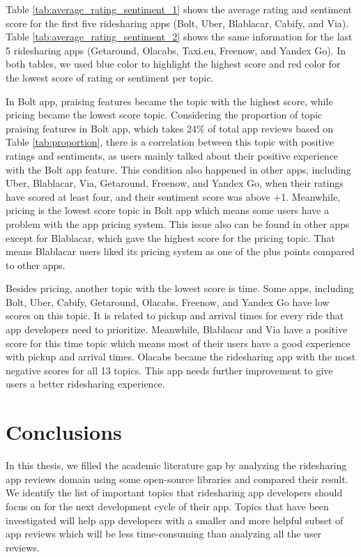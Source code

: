 \documentclass[12pt]{article}
\begin{document}
Table \ref{tab:average_rating_sentiment_1} shows the average rating and sentiment score for the first five ridesharing apps (Bolt, Uber, Blablacar, Cabify, and Via). Table \ref{tab:average_rating_sentiment_2} shows the same information for the last 5 ridesharing apps (Getaround, Olacabs, Taxi.eu, Freenow, and Yandex Go). In both tables, we used blue color to highlight the highest score and red color for the lowest score of rating or sentiment per topic.

In Bolt app, praising features became the topic with the highest score, while pricing became the lowest score topic. Considering the proportion of topic praising features in Bolt app, which takes 24\% of total app reviews based on Table \ref{tab:proportion}, there is a correlation between this topic with positive ratings and sentiments, as users mainly talked about their positive experience with the Bolt app feature. This condition also happened in other apps, including Uber, Blablacar, Via, Getaround, Freenow, and Yandex Go, when their ratings have scored at least four, and their sentiment score was above +1. Meanwhile, pricing is the lowest score topic in Bolt app which means some users have a problem with the app pricing system. This issue also can be found in other apps except for Blablacar, which gave the highest score for the pricing topic. That means Blablacar users liked its pricing system as one of the plus points compared to other apps.

Besides pricing, another topic with the lowest score is time. Some apps, including Bolt, Uber, Cabify, Getaround, Olacabs, Freenow, and Yandex Go have low scores on this topic. It is related to pickup and arrival times for every ride that app developers need to prioritize. Meanwhile, Blablacar and Via have a positive score for this time topic which means most of their users have a good experience with pickup and arrival times. Olacabs became the ridesharing app with the most negative scores for all 13 topics. This app needs further improvement to give users a better ridesharing experience.

\newpage
\section{Conclusions}
In this thesis, we filled the academic literature gap by analyzing the ridesharing app reviews domain using some open-source libraries and compared their result. We identify the list of important topics that ridesharing app developers should focus on for the next development cycle of their app. Topics that have been investigated will help app developers with a smaller and more helpful subset of app reviews which will be less time-consuming than analyzing all the user reviews. 
\end{document}
